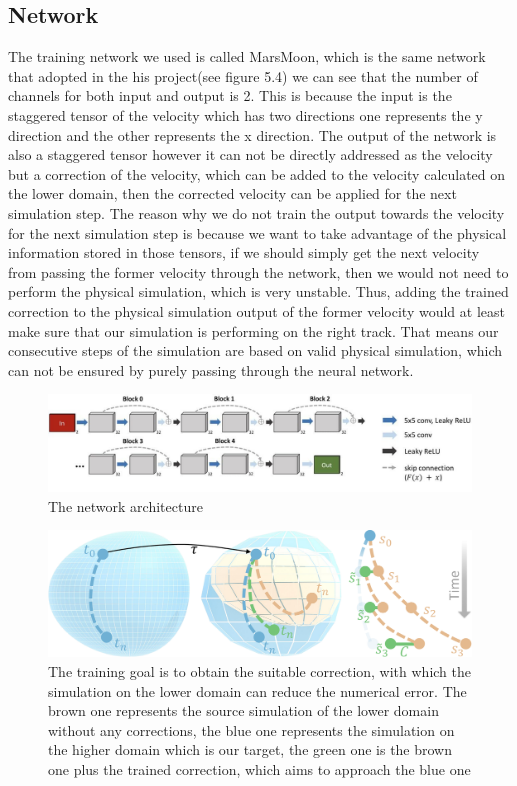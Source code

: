 \documentclass[a4paper,12pt,twoside]{report}
\begin{document}
\subsection{Network}
The training network we used is called MarsMoon, which is the same network that \citeauthor{um2020sol} adopted in the his project(see figure 5.4) we can see that the number of channels for both input and output is 2. This is because the input is the staggered tensor of the velocity which has two directions one represents the y direction and the other represents the x direction. The output of the network is also a staggered tensor however it can not be directly addressed as the velocity but a correction of the velocity, which can be added to the velocity calculated on the lower domain, then the corrected velocity can be applied for the next simulation step. The reason why we do not train the output towards the velocity for the next simulation step is because we want to take advantage of the physical information stored in those tensors, if we should simply get the next velocity from passing the former velocity through the network, then we would not need to perform the physical simulation, which is very unstable. Thus, adding the trained correction to the physical simulation output of the former velocity would at least make sure that our simulation is performing on the right track. That means our consecutive steps of the simulation are based on valid physical simulation, which can not be ensured by purely passing through the neural network.
\begin{figure}
\centering
\includegraphics[width=1.0\textwidth]{marsmoon.jpg}
\caption{The network architecture\cite{um2020sol}}
\end{figure}

\begin{figure}
\centering
\includegraphics[width=1.0\textwidth]{Manifolds.pdf}
\caption{The training goal is to obtain the suitable correction, with which the simulation on the lower domain can reduce the numerical error. The brown one represents the source simulation of the lower domain without any corrections, the blue one represents the simulation on the higher domain which is our target, the green one is the brown one plus the trained correction, which aims to approach the blue one\cite{um2020sol}}
\end{figure}
\end{document}

